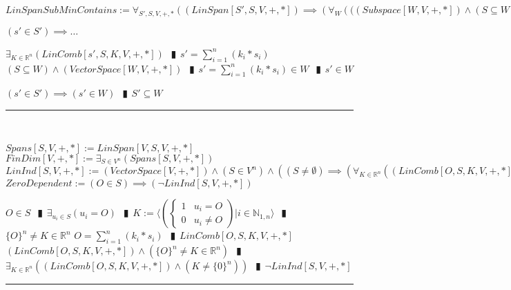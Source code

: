 \documentclass{book}
\newcommand{\abr}{:=}
\newcommand{\pipe}{$\phantom{(}\vrectangleblack\phantom{)}$}
\newcommand{\pr}[1]{\left(#1\right)}
\begin{document}
\begin{shaded}
$LinSpanSubMinContains \abr \forall_{S', S, V, +, *}\pr{(LinSpan[S', S, V, +, *]) \implies \pr{\forall_{W}\pr{((Subspace[W, V, + ,*]) \land (S \subseteq W)} \implies (S' \subseteq W)}}$
\begin{enumerate}
  \lit $(s' \in S') \implies \ldots$
  \begin{enumerate}
    \lit $\exists_{K \in \mathbb{R}^n}(LinComb[s', S, K, V, +, *])$ \pipe $s' = \sum_{i = 1}^{n}(k_i * s_i)$
    \lit $(S \subseteq W) \land (VectorSpace[W, V, + ,*])$ \pipe $s' = \sum_{i = 1}^{n}(k_i * s_i) \in W$ \pipe $s' \in W$
  \end{enumerate}
  \lit $(s' \in S') \implies (s' \in W)$ \pipe $S' \subseteq W$
\end{enumerate} \vspace{.75mm} \hrule \vspace{.75mm} \ \\ 
\end{shaded} %

$Spans[S, V, +, *] \abr LinSpan[V, S, V, +, *]$ \\
$FinDim[V, +, *] \abr \exists_{S \in V^n}(Spans[S, V, +, *])$ \\

$LinInd[S, V, +, *] \abr (VectorSpace[V, +, *]) \land (S \in V^n) \land \pr{(S \neq \emptyset) \implies \pr{\forall_{K \in \mathbb{R}^n}\pr{(LinComb[O, S, K, V, +, *]) \implies (K = \{0\}^n)}}}$ \\

$ZeroDependent \abr (O \in S) \implies (\lnot LinInd[S, V, +, *])$
\begin{enumerate}
  \lit $O \in S$ \pipe $\exists_{u_i \in S}(u_i = O)$ \pipe $K \abr \langle \left(\begin{cases} 
      1 & u_i = O \\
      0 & u_i \neq O 
    \end{cases}\right) | i \in \mathbb{N}_{1, n} \rangle$ \pipe $\{O\}^n \neq K \in \mathbb{R}^n$
  \lit $O = \sum_{i = 1}^{n}(k_i * s_i)$ \pipe $LinComb[O, S, K, V, +, *]$
  \lit $(LinComb[O, S, K, V, +, *]) \land (\{O\}^n \neq K \in \mathbb{R}^n)$ \pipe $\exists_{K \in \mathbb{R}^n}\pr{(LinComb[O, S, K, V, +, *]) \land (K \neq \{0\}^n)}$ \pipe $\lnot LinInd[S, V, +, *]$
\end{enumerate} \vspace{.75mm} \hrule \vspace{.75mm} \ \\ 
\end{document}
